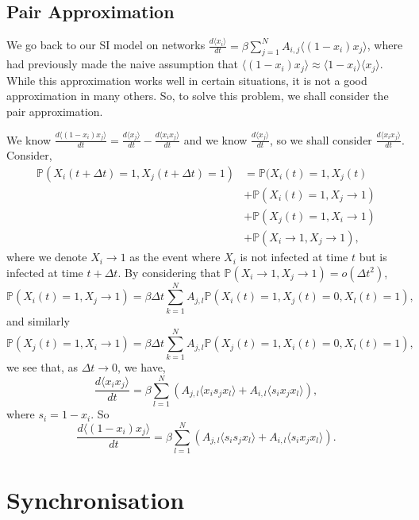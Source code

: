 \documentclass[
]{article}
\theoremstyle{definition}
\theoremstyle{definition}
\begin{document}
\hypertarget{pair-approximation}{%
\subsection{Pair Approximation}\label{pair-approximation}}

We go back to our SI model on networks
\(\frac{d\langle x_i \rangle}{dt} = \beta \sum_{j = 1}^N A_{i, j}\langle (1 - x_i)x_j \rangle\),
where had previously made the naive assumption that
\(\langle (1 - x_i)x_j \rangle \approx \langle 1 - x_i \rangle \langle x_j \rangle\).
While this approximation works well in certain situations, it is not a
good approximation in many others. So, to solve this problem, we shall
consider the pair approximation.

We know
\(\frac{d\langle (1 - x_i) x_j \rangle}{dt} = \frac{d\langle x_j \rangle}{dt} - \frac{d\langle x_i x_j \rangle}{dt}\)
and we know \(\frac{d\langle x_j \rangle}{dt}\), so we shall consider
\(\frac{d\langle x_i x_j \rangle}{dt}\). Consider, \begin{align*}
  \mathbb{P}(X_i (t + \Delta t) = 1, X_j (t + \Delta t) = 1) & = 
    \mathbb{P}(X_i (t) = 1, X_j (t) \\
  & + \mathbb{P}(X_i (t) = 1, X_j \to 1) \\
  & + \mathbb{P}(X_j (t) = 1, X_i \to 1) \\
  & + \mathbb{P}(X_i \to 1, X_j \to 1),
\end{align*} where we denote \(X_i \to 1\) as the event where \(X_i\) is
not infected at time \(t\) but is infected at time \(t + \Delta t\). By
considering that \(\mathbb{P}(X_i \to 1, X_j \to 1) = o(\Delta t^2)\),\\
\[\mathbb{P}(X_i (t) = 1, X_j \to 1) = \beta \Delta t 
  \sum_{k = 1}^N A_{j, l} \mathbb{P}(X_i(t) = 1, X_j(t) = 0, X_l(t) = 1),\]
and similarly \[\mathbb{P}(X_j (t) = 1, X_i \to 1) = \beta \Delta t 
  \sum_{k = 1}^N A_{j, l} \mathbb{P}(X_j(t) = 1, X_i(t) = 0, X_l(t) = 1),\]
we see that, as \(\Delta t \to 0\), we have,
\[\frac{d\langle x_i x_j \rangle}{dt} = \beta \sum_{l = 1}^N 
  \left(A_{j, l} \langle x_i s_j x_l \rangle + A_{i, l} \langle s_i x_j x_l \rangle \right),\]
where \(s_i = 1 - x_i\). So
\[\frac{d\langle (1 - x_i) x_j \rangle}{dt} = \beta \sum_{l = 1}^N 
  \left(A_{j, l} \langle s_i s_j x_l \rangle + A_{i, l} \langle s_i x_j x_l \rangle \right).\]

\newpage

\hypertarget{synchronisation}{%
\section{Synchronisation}\label{synchronisation}}
\end{document}
